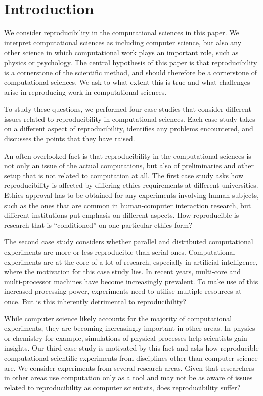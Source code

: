 \section{Introduction}
\label{s:intro}


We consider reproducibility in the computational sciences in this paper.  We
interpret computational sciences as including computer science, but also any
other science in which computational work plays an important role, such as
physics or psychology. The central hypothesis of this paper is that
reproducibility is a cornerstone of the scientific method, and should therefore
be a cornerstone of computational sciences. We ask to what extent this is true
and what challenges arise in reproducing work in computational sciences.

To study these questions, we performed four case studies that consider different
issues related to reproducibility in computational sciences.  Each case study
takes on a different aspect of reproducibility, identifies any problems
encountered, and discusses the points that they have raised.

An often-overlooked fact is that reproducibility in the computational sciences
is not only an issue of the actual computations, but also of preliminaries and
other setup that is not related to computation at all. The first case study asks
how reproducibility is affected by differing ethics requirements at different
universities. Ethics approval has to be obtained for any experiments involving
human subjects, such as the ones that are common in human-computer interaction
research, but different institutions put emphasis on different aspects. How
reproducible is research that is ``conditioned'' on one particular ethics form?

The second case study considers whether parallel and distributed computational
experiments are more or less reproducible than serial ones. Computational
experiments are at the core of a lot of research, especially in artificial
intelligence, where the motivation for this case study lies. In recent years,
multi-core and multi-processor machines have become increasingly prevalent. To
make use of this increased processing power, experiments need to utilise
multiple resources at once. But is this inherently detrimental to
reproducibility?

While computer science likely accounts for the majority of computational
experiments, they are becoming increasingly important in other areas. In physics
or chemistry for example, simulations of physical processes help scientists gain
insights. Our third case study is motivated by this fact and asks how
reproducible computational scientific experiments from disciplines other than
computer science are. We consider experiments from several research areas. Given
that researchers in other areas use computation only as a tool and may not be
as aware of issues related to reproducibility as computer scientists, does
reproducibility suffer?

